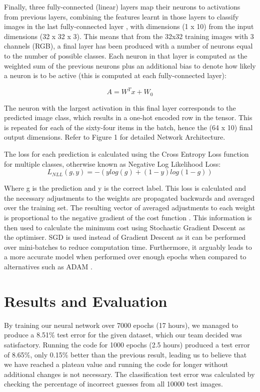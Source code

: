 \documentclass[journal]{IEEEtran}
\begin{document}
Finally, three fully-connected (linear) layers map their neurons to activations from previous layers, combining the features learnt in those layers to classify images in the last fully-connected layer \cite{matlab}, with dimensions (1 x 10) from the input dimensions (32 x 32 x 3). This means that from the 32x32 training images with 3 channels (RGB), a final layer has been produced with a number of neurons equal to the number of possible classes. Each neuron in that layer is computed as the weighted sum of the previous neurons plus an additional bias to denote how likely a neuron is to be active (this is computed at each fully-connected layer):

\begin{equation*}
    A = W^Tx + W_{0}
\end{equation*}

The neuron with the largest activation in this final layer corresponds to the predicted image class, which results in a one-hot encoded row in the tensor. This is repeated for each of the sixty-four items in the batch, hence the (64 x 10) final output dimensions. Refer to Figure 1 for detailed Network Architecture.

The loss for each prediction is calculated using the  Cross Entropy Loss function for multiple classes, otherwise known as Negative Log Likelihood Loss:
\begin{equation*}
    L_{NLL}(g, y) = -(y log(g) + (1 - y) log(1 - g))
\end{equation*}

Where g is the prediction and y is the correct label. This loss is calculated and the necessary adjustments to the weights are propagated backwards and averaged over the training set. The resulting vector of averaged adjustments to each weight is proportional to the negative gradient of the cost function \cite{3b1b}. This information is then used to calculate the minimum cost using Stochastic Gradient Descent as the optimiser. SGD is used instead of Gradient Descent as it can be performed over mini-batches to reduce computation time. Furthermore, it arguably leads to a more accurate model when performed over enough epochs when compared to alternatives such as ADAM \cite{cifar10}.


\section{Results and Evaluation}
By training our neural network over 7000 epochs (17 hours), we managed to produce a 8.51\% test error for the given dataset, which our team decided was satisfactory. Running the code for 1000 epochs (2.5 hours) produced a test error of 8.65\%, only 0.15\% better than the previous result, leading us to believe that we have reached a plateau value and running the code for longer without additional changes is not necessary. The classification test error was calculated by checking the percentage of incorrect guesses from all 10000 test images.
\end{document}
